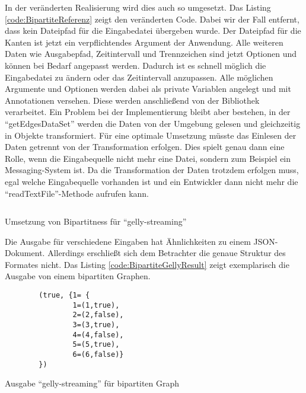 In der veränderten Realisierung wird dies auch so umgesetzt. Das Listing \ref{code:BipartiteReferenz}
zeigt den veränderten Code. Dabei wir der Fall entfernt, dass kein Dateipfad
für die Eingabedatei übergeben wurde. Der Dateipfad für die Kanten ist jetzt ein
verpflichtendes Argument der Anwendung. Alle weiteren Daten wie Ausgabepfad,
Zeitintervall und Trennzeichen sind jetzt Optionen und können bei Bedarf angepasst
werden. Dadurch ist es schnell möglich die Eingabedatei zu ändern oder das
Zeitintervall anzupassen. Alle möglichen Argumente und Optionen werden dabei als
private Variablen angelegt und mit Annotationen versehen. Diese werden anschließend
von der Bibliothek verarbeitet.  Ein Problem bei der Implementierung bleibt aber
bestehen, in der \enquote{getEdgesDataSet} werden die Daten von der Umgebung
gelesen und gleichzeitig in Objekte transformiert. Für eine optimale Umsetzung
müsste das Einlesen der Daten getrennt von der Transformation erfolgen.
Dies spielt genau dann eine Rolle, wenn die Eingabequelle nicht mehr eine Datei,
sondern zum Beispiel ein Messaging-System ist. Da die Transformation der
Daten trotzdem erfolgen muss, egal welche Eingabequelle vorhanden ist und ein
Entwickler dann nicht mehr die \enquote{readTextFile}-Methode aufrufen kann.

\begin{listing}
    \inputminted[breaklines=true]{java}{../material/code/GellyStreamingResult.java}
    \caption{Umsetzung von Bipartitness für \enquote{gelly-streaming}}
    \label{code:BipartiteReferenz}
\end{listing}

Die Ausgabe für verschiedene Eingaben hat Ähnlichkeiten zu einem
\gls{JSON}-Dokument. Allerdings erschließt sich dem Betrachter die genaue
Struktur des Formates nicht. Das Listing \ref{code:BipartiteGellyResult} zeigt
exemplarisch die Ausgabe von einem bipartiten Graphen.

\begin{listing}
    \begin{verbatim}
        (true, {1= {
                1=(1,true),
                2=(2,false),
                3=(3,true),
                4=(4,false),
                5=(5,true),
                6=(6,false)}
        })
    \end{verbatim}
    \caption{Ausgabe \enquote{gelly-streaming} für bipartiten Graph}
    \label{code:BipartiteGellyResult}
\end{listing}

